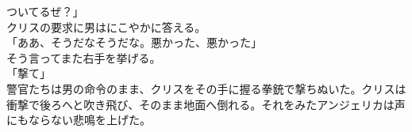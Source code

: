 \documentclass[b5j,10pt,openany]{jsbook}
\begin{document}
ついてるぜ？」\\クリスの要求に男はにこやかに答える。\\「ああ、そうだなそうだな。悪かった、悪かった」\\そう言ってまた右手を挙げる。\\「撃て」\\警官たちは男の命令のまま、クリスをその手に握る拳銃で撃ちぬいた。クリスは衝撃で後ろへと吹き飛び、そのまま地面へ倒れる。それをみたアンジェリカは声にもならない悲鳴を上げた。\
\end{document}
